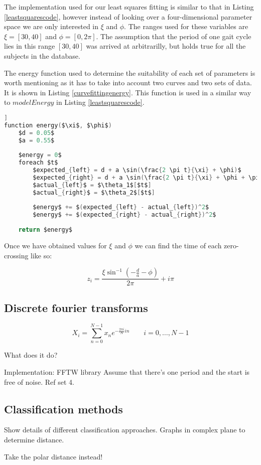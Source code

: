 The implementation used for our least squares fitting is similar to that in Listing \ref{leastsquarescode}, however instead of looking over a four-dimensional parameter space we are only interested in $\xi$ and $\phi$.
The ranges used for these variables are $\xi = [30, 40]$ and $\phi = [0, 2\pi]$.
The assumption that the period of one gait cycle lies in this range $[30, 40]$ was arrived at arbitrarilly, but holds true for all the subjects in the database.

The energy function used to determine the suitability of each set of parameters is worth mentioning as it has to take into account two curves and two sets of data.
It is shown in Listing \ref{curvefittingenergy}.
This function is used in a similar way to $modelEnergy$ in Listing \ref{leastsquarescode}.

\begin{lstlisting}[firstnumber=auto,language=c,morekeywords={step,function,foreach,in},frame=single,mathescape=true,caption={Energy function pseudo-code},label={curvefittingenergy},float=[tb]]
function energy($\xi$, $\phi$)
	$d = 0.05$
	$a = 0.55$
	
	$energy = 0$
	foreach $t$
		$expected_{left} = d + a \sin(\frac{2 \pi t}{\xi} + \phi)$
		$expected_{right} = d + a \sin(\frac{2 \pi t}{\xi} + \phi + \pi)$
		$actual_{left}$ = $\theta_1$[$t$]
		$actual_{right}$ = $\theta_2$[$t$]
		
		$energy$ += $(expected_{left} - actual_{left})^2$
		$energy$ += $(expected_{right} - actual_{right})^2$
	
	return $energy$
\end{lstlisting}

Once we have obtained values for $\xi$ and $\phi$ we can find the time of each zero-crossing like so:

\begin{equation}
	z_i = \frac{\xi \sin^{-1}(-\frac{d}{a} - \phi)}{2\pi} + i\pi
\end{equation}


\subsection{Discrete fourier transforms}



\begin{equation}
	X_i = \sum_{n=0}^{N-1} x_n e^{-\frac{2 \pi i}{N} i n} \quad \quad i = 0, \dots, N-1
\end{equation}


What does it do?

Implementation: FFTW library \cite{FFTW}
Assume that there's one period and the start is free of noise.  Ref set 4.

\subsection{Classification methods}
Show details of different classification approaches.
Graphs in complex plane to determine distance.

Take the polar distance instead!
